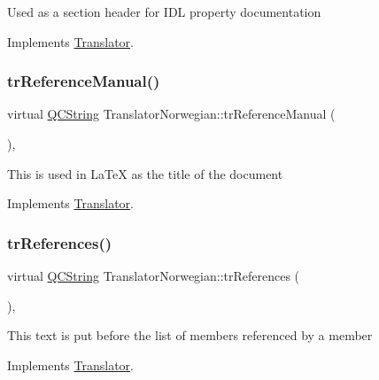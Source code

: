 Used as a section header for I\+DL property documentation 

Implements \mbox{\hyperlink{class_translator}{Translator}}.

\mbox{\label{class_translator_norwegian_a9b6f0458a1a819871e240abb2d77b179}} 
\subsubsection{\texorpdfstring{trReferenceManual()}{trReferenceManual()}}
{\footnotesize\ttfamily virtual \mbox{\hyperlink{class_q_c_string}{Q\+C\+String}} Translator\+Norwegian\+::tr\+Reference\+Manual (\begin{DoxyParamCaption}{ }\end{DoxyParamCaption})\hspace{0.3cm}{\ttfamily [inline]}, {\ttfamily [virtual]}}

This is used in La\+TeX as the title of the document 

Implements \mbox{\hyperlink{class_translator}{Translator}}.

\mbox{\label{class_translator_norwegian_a57b022c381ab342200d6238488b2e4a5}} 
\subsubsection{\texorpdfstring{trReferences()}{trReferences()}}
{\footnotesize\ttfamily virtual \mbox{\hyperlink{class_q_c_string}{Q\+C\+String}} Translator\+Norwegian\+::tr\+References (\begin{DoxyParamCaption}{ }\end{DoxyParamCaption})\hspace{0.3cm}{\ttfamily [inline]}, {\ttfamily [virtual]}}

This text is put before the list of members referenced by a member 

Implements \mbox{\hyperlink{class_translator}{Translator}}.

\mbox{\label{class_translator_norwegian_ae612ce5aee18c767dbfcece833d81a95}} 
